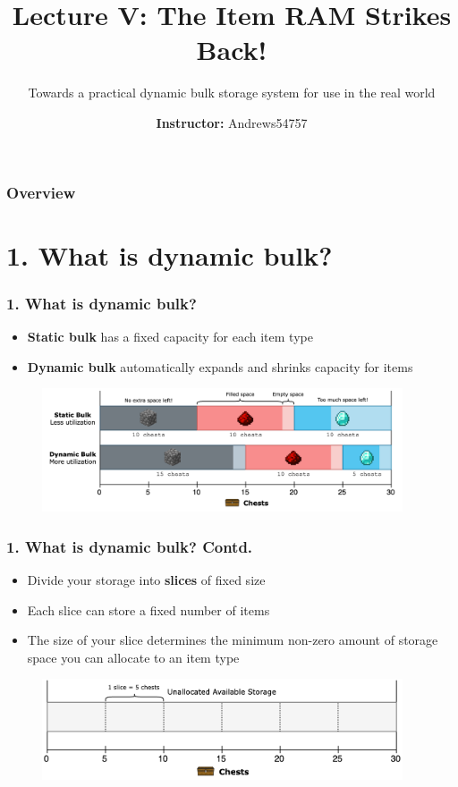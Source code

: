 \documentclass[aspectratio=169]{beamer}
\title[Practical Encoded Dynamic Bulk]{Lecture V: The Item RAM Strikes Back!}
\subtitle{Towards a practical dynamic bulk storage system for use in the real world}
\date{}
\author{\textbf{Instructor:} Andrews54757}
\institute{
    CSE269: Introduction to Encoded Storage\\
    S$\infty$ntech Annals
}
\begin{document}
\maketitle

\begin{frame}
\frametitle{Overview}
\tableofcontents
\end{frame}

\AtBeginSection{}

\section{1. What is dynamic bulk?}

\begin{frame}
	\frametitle{1. What is dynamic bulk?}

    \begin{itemize}
		\item \textbf{Static bulk} has a fixed capacity for each item type
        \item \textbf{Dynamic bulk} automatically expands and shrinks capacity for items
	\end{itemize}

	\begin{figure}
        \includegraphics[width=0.95\textwidth]{dynstatic.png}
	\end{figure}
\end{frame}

\begin{frame}
	\frametitle{1. What is dynamic bulk? Contd.}

    \begin{itemize}
		\item Divide your storage into \textbf{slices} of fixed size
        \item Each slice can store a fixed number of items
        \item The size of your slice determines the minimum non-zero amount of storage space you can allocate to an item type
	\end{itemize}

    \begin{figure}
        \includegraphics[width=0.95\textwidth]{logic0.png}
	\end{figure}


\end{frame}
\end{document}
